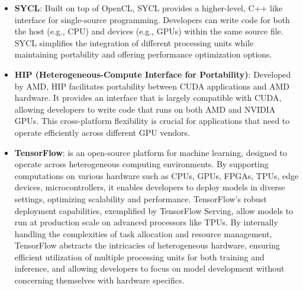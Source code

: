 \begin{itemize}
    
    \item \textbf{SYCL}: Built on top of OpenCL, SYCL provides a higher-level, C++ like interface for single-source programming. Developers can write code for both the host (e.g., CPU) and devices (e.g., GPUs) within the same source file. SYCL simplifies the integration of different processing units while maintaining portability and offering performance optimization options.
    
    \item \textbf{HIP (Heterogeneous-Compute Interface for Portability)}: Developed by AMD, HIP facilitates portability between CUDA applications and AMD hardware. It provides an interface that is largely compatible with CUDA, allowing developers to write code that runs on both AMD and NVIDIA GPUs. This cross-platform flexibility is crucial for applications that need to operate efficiently across different GPU vendors.

    \item \textbf {TensorFlow}: is an open-source platform for machine learning, designed to operate across heterogeneous computing environments. By supporting computations on various hardware such as CPUs, GPUs, FPGAs, TPUs, edge devices, microcontrollers, it enables developers to deploy models in diverse settings, optimizing scalability and performance. TensorFlow's robust deployment capabilities, exemplified by TensorFlow Serving, allow models to run at production scale on advanced processors like TPUs. By internally handling the complexities of task allocation and resource management, TensorFlow abstracts the intricacies of heterogeneous hardware, ensuring efficient utilization of multiple processing units for both training and inference, and allowing developers to focus on model development without concerning themselves with hardware specifics.

    
\end{itemize}

